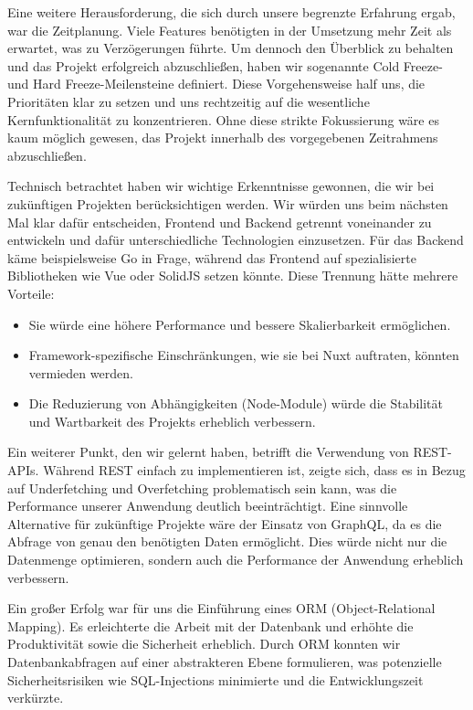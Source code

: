 \documentclass[a4paper,12pt]{article}
\begin{document}
Eine weitere Herausforderung, die sich durch unsere begrenzte Erfahrung ergab,
war die Zeitplanung. Viele Features benötigten in der Umsetzung mehr Zeit als
erwartet, was zu Verzögerungen führte. Um dennoch den Überblick zu behalten und
das Projekt erfolgreich abzuschließen, haben wir sogenannte Cold Freeze- und
Hard Freeze-Meilensteine definiert. Diese Vorgehensweise half uns, die
Prioritäten klar zu setzen und uns rechtzeitig auf die wesentliche
Kernfunktionalität zu konzentrieren. Ohne diese strikte Fokussierung wäre es
kaum möglich gewesen, das Projekt innerhalb des vorgegebenen Zeitrahmens
abzuschließen.

Technisch betrachtet haben wir wichtige Erkenntnisse gewonnen, die wir bei
zukünftigen Projekten berücksichtigen werden. Wir würden uns beim nächsten Mal
klar dafür entscheiden, Frontend und Backend getrennt voneinander zu entwickeln
und dafür unterschiedliche Technologien einzusetzen. Für das Backend käme
beispielsweise Go in Frage, während das Frontend auf spezialisierte
Bibliotheken wie Vue oder SolidJS setzen könnte. Diese Trennung hätte mehrere
Vorteile:

\begin{itemize}
    \item Sie würde eine höhere Performance und bessere Skalierbarkeit
        ermöglichen.
    \item Framework-spezifische Einschränkungen, wie sie bei Nuxt auftraten,
        könnten vermieden werden.
    \item Die Reduzierung von Abhängigkeiten (Node-Module) würde die Stabilität
        und Wartbarkeit des Projekts erheblich verbessern.
\end{itemize}

Ein weiterer Punkt, den wir gelernt haben, betrifft die Verwendung von
REST-APIs. Während REST einfach zu implementieren ist, zeigte sich, dass es in
Bezug auf Underfetching und Overfetching problematisch sein kann, was die
Performance unserer Anwendung deutlich beeinträchtigt. Eine sinnvolle
Alternative für zukünftige Projekte wäre der Einsatz von GraphQL, da es die
Abfrage von genau den benötigten Daten ermöglicht. Dies würde nicht nur die
Datenmenge optimieren, sondern auch die Performance der Anwendung erheblich
verbessern.

Ein großer Erfolg war für uns die Einführung eines ORM (Object-Relational
Mapping). Es erleichterte die Arbeit mit der Datenbank und erhöhte die
Produktivität sowie die Sicherheit erheblich. Durch ORM konnten wir
Datenbankabfragen auf einer abstrakteren Ebene formulieren, was potenzielle
Sicherheitsrisiken wie SQL-Injections minimierte und die Entwicklungszeit
verkürzte.
\end{document}
